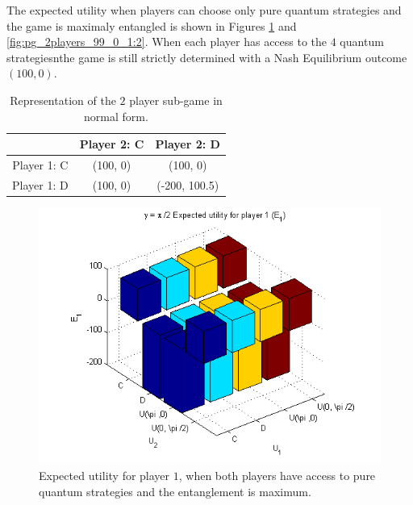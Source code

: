 The expected utility when players can choose only pure quantum strategies and the game is maximaly entangled is shown in Figures \ref{fig:pg_2players_99_0_1:1} and \ref{fig:pg_2players_99_0_1:2}. When each player has access to the $4$ quantum strategiesnthe game is still strictly determined with a Nash Equilibrium outcome $(100,0)$.

\begin{table}[h]
\begin{center}
\begin{centering}
\begin{tabular}{ccc}
\hline 
  & Player 2: C & Player 2: D\tabularnewline
\hline 
Player 1: C & (100, 0) & (100, 0)\tabularnewline
Player 1: D & (100, 0) & (-200, 100.5)\tabularnewline
\hline 
\end{tabular}

\par\end{centering}
\caption{Representation of the $2$ player sub-game in normal form.}
\label{tab:classico2jogadores_analise}
\end{center}
\end{table}

\begin{figure}[h!]
\centering 
\includegraphics[scale=0.60]{Figures/1.5qubit/p2_E1.png}
\caption{Expected utility for player $1$, when both players have access to pure quantum strategies and the entanglement is maximum. }
\label{fig:pg_2players_99_0_1:1}
\end{figure}

